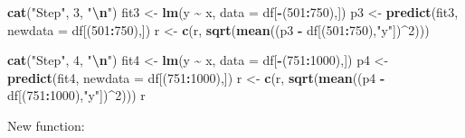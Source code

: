 \documentclass[
]{article}
\newenvironment{Shaded}{\begin{snugshade}}{\end{snugshade}}
\newcommand{\AttributeTok}[1]{\textcolor[rgb]{0.13,0.29,0.53}{#1}}
\newcommand{\DecValTok}[1]{\textcolor[rgb]{0.00,0.00,0.81}{#1}}
\newcommand{\FunctionTok}[1]{\textcolor[rgb]{0.13,0.29,0.53}{\textbf{#1}}}
\newcommand{\NormalTok}[1]{#1}
\newcommand{\OtherTok}[1]{\textcolor[rgb]{0.56,0.35,0.01}{#1}}
\newcommand{\SpecialCharTok}[1]{\textcolor[rgb]{0.81,0.36,0.00}{\textbf{#1}}}
\newcommand{\StringTok}[1]{\textcolor[rgb]{0.31,0.60,0.02}{#1}}
\begin{document}
\begin{Shaded}
\begin{Highlighting}[]
\FunctionTok{cat}\NormalTok{(}\StringTok{"Step"}\NormalTok{, }\DecValTok{3}\NormalTok{, }\StringTok{"}\SpecialCharTok{\textbackslash{}n}\StringTok{"}\NormalTok{)}
\NormalTok{fit3 }\OtherTok{\textless{}{-}} \FunctionTok{lm}\NormalTok{(y }\SpecialCharTok{\textasciitilde{}}\NormalTok{ x, }\AttributeTok{data =}\NormalTok{ df[}\SpecialCharTok{{-}}\NormalTok{(}\DecValTok{501}\SpecialCharTok{:}\DecValTok{750}\NormalTok{),])}
\NormalTok{p3 }\OtherTok{\textless{}{-}} \FunctionTok{predict}\NormalTok{(fit3, }\AttributeTok{newdata =}\NormalTok{ df[(}\DecValTok{501}\SpecialCharTok{:}\DecValTok{750}\NormalTok{),])}
\NormalTok{r }\OtherTok{\textless{}{-}} \FunctionTok{c}\NormalTok{(r, }\FunctionTok{sqrt}\NormalTok{(}\FunctionTok{mean}\NormalTok{((p3 }\SpecialCharTok{{-}}\NormalTok{ df[(}\DecValTok{501}\SpecialCharTok{:}\DecValTok{750}\NormalTok{),}\StringTok{"y"}\NormalTok{])}\SpecialCharTok{\^{}}\DecValTok{2}\NormalTok{)))}

\FunctionTok{cat}\NormalTok{(}\StringTok{"Step"}\NormalTok{, }\DecValTok{4}\NormalTok{, }\StringTok{"}\SpecialCharTok{\textbackslash{}n}\StringTok{"}\NormalTok{)}
\NormalTok{fit4 }\OtherTok{\textless{}{-}} \FunctionTok{lm}\NormalTok{(y }\SpecialCharTok{\textasciitilde{}}\NormalTok{ x, }\AttributeTok{data =}\NormalTok{ df[}\SpecialCharTok{{-}}\NormalTok{(}\DecValTok{751}\SpecialCharTok{:}\DecValTok{1000}\NormalTok{),])}
\NormalTok{p4 }\OtherTok{\textless{}{-}} \FunctionTok{predict}\NormalTok{(fit4, }\AttributeTok{newdata =}\NormalTok{ df[(}\DecValTok{751}\SpecialCharTok{:}\DecValTok{1000}\NormalTok{),])}
\NormalTok{r }\OtherTok{\textless{}{-}} \FunctionTok{c}\NormalTok{(r, }\FunctionTok{sqrt}\NormalTok{(}\FunctionTok{mean}\NormalTok{((p4 }\SpecialCharTok{{-}}\NormalTok{ df[(}\DecValTok{751}\SpecialCharTok{:}\DecValTok{1000}\NormalTok{),}\StringTok{"y"}\NormalTok{])}\SpecialCharTok{\^{}}\DecValTok{2}\NormalTok{)))  }
\NormalTok{r}
\end{Highlighting}
\end{Shaded}

New function:
\end{document}
